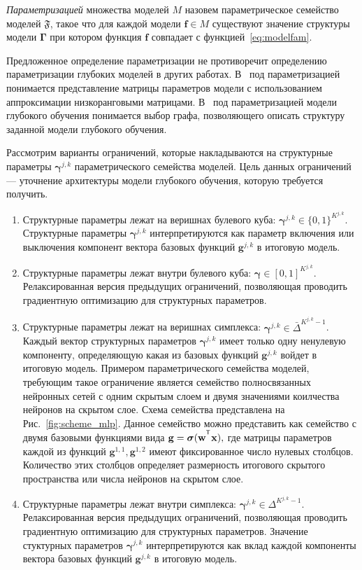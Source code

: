 \begin{defin}
\textit{Параметризацией }множества моделей $M$ назовем параметрическое семейство моделей $\mathfrak{F}$, такое что для каждой модели $\mathbf{f} \in M$ существуют значение структуры модели $\boldsymbol{\Gamma}$ при котором функция $\mathbf{f}$ совпадает с функцией~\eqref{eq:modelfam}.
\end{defin}
Предложенное определение параметризации не противоречит определению параметризации глубоких моделей в других работах. В~\cite{need_prune} под параметризацией понимается представление матрицы параметров модели с использованием аппроксимации низкоранговыми матрицами. В~\cite{generative_graphs} под параметризацией модели глубокого обучения понимается выбор графа, позволяющего описать структуру заданной модели глубокого обучения. 

Рассмотрим варианты ограничений, которые накладываются на структурные параметры $\boldsymbol{\gamma}^{j,k}$ параметрического семейства моделей. Цель данных ограничений --- уточнение архитектуры модели глубокого обучения, которую требуется получить. 
\begin{enumerate}
\item Структурные параметры лежат на веришнах булевого куба: $\boldsymbol{\gamma}^{j,k} \in \{0,1\}^{K^{j,k}}$. Структурные параметры $\boldsymbol{\gamma}^{j,k}$ интерпретируются как параметр включения или выключения компонент вектора базовых функций $\mathbf{g}^{j,k}$ в итоговую модель.
\item Структурные параметры лежат внутри булевого куба: $\boldsymbol{\gamma} \in [0,1]^{K^{j,k}}$. Релаксированная версия предыдущих ограничений, позволяющая проводить градиентную оптимизацию для структурных параметров.
\item Структурные параметры лежат на веришнах симплекса: $\boldsymbol{\gamma}^{j,k} \in \bar{\Delta}^{K^{j,k}-1}$. Каждый вектор структурных параметров $\boldsymbol{\gamma}^{j,k}$ имеет только одну ненулевую компоненту, определяющую какая из базовых функций $\mathbf{g}^{j,k}$ войдет в итоговую модель. Примером параметрического семейства моделей, требующим такое ограничение является семейство полносвязанных нейронных сетей с одним скрытым слоем и двумя значениями коилчества нейронов на скрытом слое. Схема семейства представлена на Рис.~\ref{fig:scheme_mlp}. Данное семейство можно представить как семейство с двумя базовыми функциями вида $\mathbf{g} = \boldsymbol{\sigma}(\mathbf{w}^{\T}\mathbf{x}),$ где матрицы параметров каждой из функций  $\mathbf{g}^{1,1}, \mathbf{g}^{1,2}$ имеют фиксированное число нулевых столбцов. Количество этих столбцов определяет размерность итогового скрытого пространства или числа нейронов на скрытом слое.
\item  Структурные параметры лежат внутри симплекса: $\boldsymbol{\gamma}^{j,k} \in {\Delta}^{K^{j,k}-1}$. Релаксированная версия предыдущих ограничений, позволяющая проводить градиентную оптимизацию для структурных параметров. Значение стуктурных параметров $\boldsymbol{\gamma}^{j,k}$ интерпретируются как вклад каждой компоненты вектора базовых функций $\mathbf{g}^{j,k}$ в итоговую модель. 
\end{enumerate}

